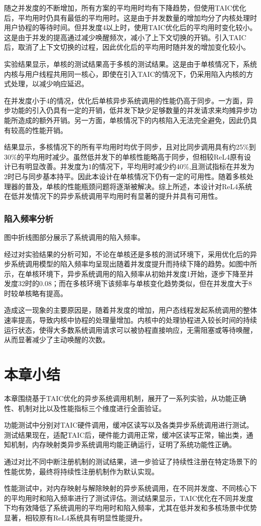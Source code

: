 随之并发度的不断增加，所有方案的平均用时均有下降趋势，但使用TAIC优化后，平均用时仍具有最低的平均用时。这是由于并发数量的增加均分了内核处理时用户协程的等待时间。但并发度4以上时，使用TAIC优化后的平均用时变化较小。这是由于并发的提高通过减少唤醒频次，减小了上下文切换的开销。引入TAIC后，取消了上下文切换的过程，因此优化后的平均用时随并发的增加变化较小。

实验结果显示，单核的测试结果高于多核的测试结果。这是由于单核情况下，系统内核与用户线程共用同一核心，即使在引入TAIC的情况下，仍采用陷入内核的方式处理，以减少响应延迟。

在并发度小于4的情况，优化后单核异步系统调用的性能仍高于同步。一方面，异步功能的引入仍具有一定的开销，低并发下缺少足够数量的并发请求来均摊异步功能所造成的额外开销。另一方面，单核情况下的内核陷入无法完全避免，因此仍具有较高的性能开销。

结果显示，多核情况下的所有平均用时均优于同步，且对比同步调用具有约25\%到30\%的平均用时减少。虽然低并发下的单核性能略高于同步，但相较ReL4原有设计已有明显改善。并发度为1的情况下，平均用时减少约40\%,且测试指标在并发为2时已与同步基本持平。因此本设计在单核情况下仍有一定的可用性。随着多核处理器的普及，单核的性能瓶颈问题将逐渐被解决。综上所述，本设计对ReL4系统在低并发情况下的异步系统调用平均用时有显著的提升并具有可用性。

\subsubsection{陷入频率分析}

图中折线图部分展示了系统调用的陷入频率。

经过对实验结果的分析可知，不论在单核还是多核的测试环境下，采用优化后的异步系统调用模型的陷入频率均呈现出随着并发度提升而持续下降的趋势。如图中所示，在单核环境下，异步系统调用的陷入频率从初始并发度1开始，逐步下降至并发度32时的0.08；而在多核环境下该频率与单核变化趋势类似，但在并发度大于8时较单核略有提高。

造成这一现象的主要原因是，随着并发度的增加，用户态线程发起系统调用的整体速率提高，导致内核中协程的处理量增加。内核中的处理协程进入较长时间的持续运行状态，使得大多数系统调用请求可以被协程直接响应，无需阻塞或等待唤醒，从而显著减少了主动唤醒的次数。

\section{本章小结}

本章围绕基于TAIC优化的异步系统调用机制，展开了一系列实验，从功能正确性、机制对比以及性能指标三个维度进行全面验证。

功能测试中分别对TAIC硬件调用，缓冲区读写以及各类异步系统调用进行测试。测试结果现在，适配TAIC后，硬件能力调用正常，缓冲区读写正常，输出类，通知机制，内存映射类异步系统调用均能正确运行，证明了系统功能性正确。

通过对比不同中断注册机制的测试结果，进一步验证了持续性注册在特定场景下的性能优势，最终将持续性注册机制作为默认实现。

性能测试中，对内存映射与解除映射的异步系统调用，在不同并发度、不同核心下的平均用时和陷入频率进行了测试评估。测试结果显示，TAIC优化在不同并发度下均有效降低了系统调用的平均用时和陷入频率，尤其在低并发和多核场景中优势显著，相较原有ReL4系统具有明显性能提升。
